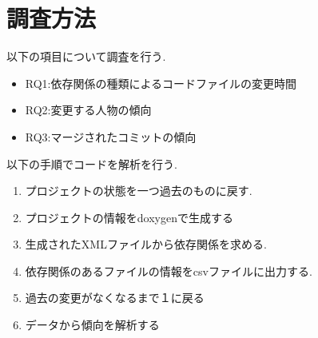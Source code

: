 \documentclass[submit,ses,noauthor]{ipsj} %
\begin{document}
                                                                                                                                                                                                                                                                                                                                                                                                                                                                                                                                                                                                                                                                                                                                                                                                                                                                                                                                                                                                                                                                                                                                                                                                                                                                                                                                                                                 
\section{調査方法}\label{調査方法}
以下の項目について調査を行う.
\begin{itemize}
\item RQ1:依存関係の種類によるコードファイルの変更時間
\item RQ2:変更する人物の傾向
\item RQ3:マージされたコミットの傾向
\end{itemize}


以下の手順でコードを解析を行う.
\begin{enumerate}
\item プロジェクトの状態を一つ過去のものに戻す.
\item プロジェクトの情報をdoxygenで生成する
\item 生成されたXMLファイルから依存関係を求める.
\item 依存関係のあるファイルの情報をcsvファイルに出力する.
\item 過去の変更がなくなるまで１に戻る
\item データから傾向を解析する
\end{enumerate}
\end{document}
